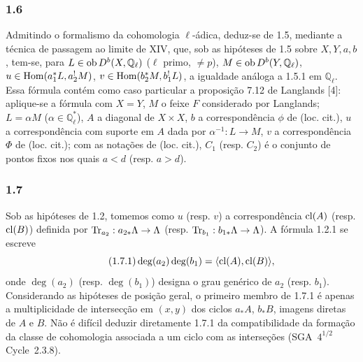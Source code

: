\subsubsection*{1.6}
Admitindo o formalismo da cohomologia $\ell$-ádica, deduz-se de 1.5, mediante a técnica de passagem ao limite de XIV, que, sob as hipóteses de 1.5 sobre $X,Y,a,b$, tem-se, para $L\in\operatorname{ob} D^b(X,\mathbb Q_\ell)$ ($\ell$ primo, $\ne p$), $M\in\operatorname{ob} D^b(Y,\mathbb Q_\ell)$, $u\in\operatorname{Hom}(a_1^*L,a_2^!M)$, $v\in\operatorname{Hom}(b_2^*M,b_1^!L)$, a igualdade análoga a 1.5.1 em $\mathbb Q_\ell$. Essa fórmula contém como caso particular a proposição 7.12 de Langlands [4]: aplique-se a fórmula com $X=Y$, $M$ o feixe $F$ considerado por Langlands; $L=\alpha M$ ($\alpha\in\mathbb Q_\ell^*$), $A$ a diagonal de $X\times X$, $b$ a correspondência $\phi$ de (loc. cit.), $u$ a correspondência com suporte em $A$ dada por $\alpha^{-1}:L\to M$, $v$ a correspondência $\Phi$ de (loc. cit.); com as notações de (loc. cit.), $C_1$ (resp. $C_2$) é o conjunto de pontos fixos nos quais $a<d$ (resp. $a>d$).

\subsubsection*{1.7}
Sob as hipóteses de 1.2, tomemos como $u$ (resp. $v$) a correspondência $\operatorname{cl}(A)$ (resp. $\operatorname{cl}(B)$) definida por $\operatorname{Tr}_{a_2}:a_{2*}\Lambda\to\Lambda$ (resp. $\operatorname{Tr}_{b_1}:b_{1*}\Lambda\to\Lambda$). A fórmula 1.2.1 se escreve
\begin{equation}\tag{1.7.1}
\deg(a_2)\deg(b_1)=\langle \operatorname{cl}(A),\operatorname{cl}(B)\rangle,
\end{equation}
onde $\deg(a_2)$ (resp. $\deg(b_1)$) designa o grau genérico de $a_2$ (resp. $b_1$). Considerando as hipóteses de posição geral, o primeiro membro de 1.7.1 é apenas a multiplicidade de intersecção em $(x,y)$ dos ciclos $a_*A$, $b_*B$, imagens diretas de $A$ e $B$. Não é difícil deduzir diretamente 1.7.1 da compatibilidade da formação da classe de cohomologia associada a um ciclo com as interseções (SGA~$4^{1/2}$ Cycle~2.3.8).

